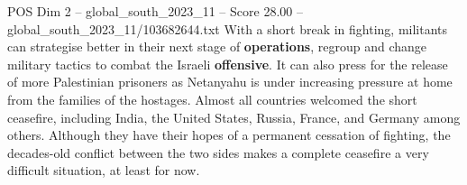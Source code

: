 \begin{textsample}{POS Dim 2 – global\_south\_2023\_11 – Score 28.00 – global\_south\_2023\_11/103682644.txt}
With a short break in fighting, militants can strategise better in their next stage of \textbf{operations}, regroup and change military tactics to combat the Israeli \textbf{offensive}.
It can also press for the release of more Palestinian prisoners as Netanyahu is under increasing pressure at home from the families of the hostages.
Almost all countries welcomed the short ceasefire, including India, the United States, Russia, France, and Germany among others.
Although they have their hopes of a permanent cessation of fighting, the decades-old conflict between the two sides makes a complete ceasefire a very difficult situation, at least for now.

\end{textsample}
